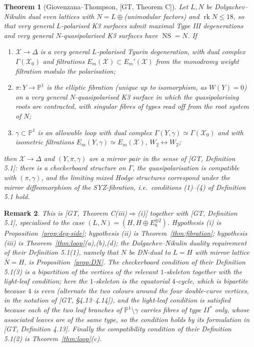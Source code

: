 \documentclass[11pt]{article}
\newtheorem{theorem}{Theorem}[section]
\newtheorem{remark}[theorem]{Remark}
\newcommand{\X}{\mathcal{X}}
\newcommand{\D}{\Delta}
\newcommand{\PP}{\mathbb{P}}
\DeclareMathOperator{\rk}{rk}
\DeclareMathOperator{\NS}{NS}
\begin{document}

\begin{theorem}[{Giovenzana--Thompson, [GT, Theorem C]}]\label{thm:GT}
Let $L,N$ be Dolgachev--Nikulin dual even lattices with
$N=L\oplus{}$(unimodular factors) and
$\rk N\le 18$, so that very general $L$-polarised K3 surfaces admit maximal
Type III degenerations and very general $N$-quasipolarised K3 surfaces have
$\NS=N$. If
\begin{enumerate}[label=(\roman*),leftmargin=2.2em]
\item $\X\to\D$ is a very general $L$-polarised Tyurin degeneration, with
dual complex $\Gamma(\X_0)$ and filtrations $E_m(\X)\subset E_m'(\X)$ from
the monodromy weight filtration modulo the polarisation;
\item $\pi\colon Y\to\PP^1$ is the elliptic fibration (unique up to
isomorphism, as $W(Y)=0$) on a very general $N$-quasipolarised K3 surface
in which the quasipolarising roots are contracted, with singular fibres of
types read off from the root system of $N$;
\item $\gamma\subset\PP^1$ is an allowable loop with dual complex
$\Gamma(Y,\gamma)\simeq\Gamma(\X_0)$ and with isometric filtrations
$E_m(Y,\gamma)\simeq E_m(\X)$, $W_2\leftrightarrow W_2$;
\end{enumerate}
then $\X\to\D$ and $(Y,\pi,\gamma)$ are a mirror pair in the sense of
[GT, Definition 5.1]: there is a checkerboard structure on $\Gamma$, the
quasipolarisation is compatible with $(\pi,\gamma)$, and the limiting mixed
Hodge structures correspond under the mirror diffeomorphism of the
SYZ-fibration, i.e.\ conditions (1)--(4) of Definition 5.1 hold.
\end{theorem}

\begin{remark}
This is [GT, Theorem C(iii)$\Rightarrow$(i)] together with [GT,
Definition 5.1], specialised to the case $(L,N)=(H,H\oplus E_8^{\oplus2})$.
Hypothesis (i) is Proposition~\ref{prop:deg-side}; hypothesis (ii) is
Theorem~\ref{thm:fibration}; hypothesis (iii) is
Theorem~\ref{thm:loop}(a),(b),(d); the Dolgachev--Nikulin duality
requirement of their Definition 5.1(1), namely that $N$ be
DN-dual to $L=H$ with mirror lattice $\bar N=H$, is
Proposition~\ref{prop:DN}. The checkerboard condition of their
Definition 5.1(3) is a bipartition of the vertices of the relevant
$1$-skeleton together with the light-leaf condition; here the
$1$-skeleton is the equatorial $4$-cycle, which is bipartite because $4$
is even (alternate the two colours around the four double-curve
vertices, in the notation of [GT, \S4.13--4.14]), and the light-leaf
condition is satisfied because each of the two leaf branches of
$\PP^1\setminus\gamma$ carries fibres of type $II^*$ only, whose
associated leaves are of the same type, so the condition holds by
its formulation in [GT, Definition 4.13]. Finally the compatibility
condition of their Definition 5.1(2) is Theorem~\ref{thm:loop}(c).
\end{remark}
\end{document}
